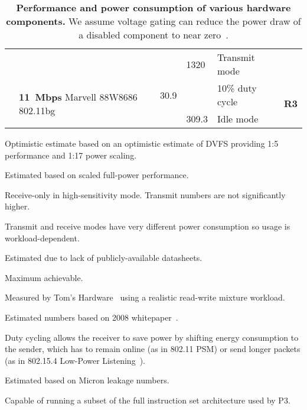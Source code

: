 \begin{table}[t]
\begin{threeparttable}
{\begin{tabularx}{\textwidth}{clrlXr}
& & &
1320\tnote{8} &
Transmit mode
& \\ \cmidrule(l){2-6}

&
\multirow{2}{*}{\textbf{11~Mbps} Marvell 88W8686 802.11bg} &
30.9\tnote{2} & &
10\% duty cycle\tnote{9} &
\multirow{2}{*}{\textbf{R3}}
\\

& & &
309.3\tnote{4} &
Idle mode\tnote{4}
& \\ \toprule

\end{tabularx}
}
{\footnotesize
\begin{tablenotes}
\item [1] Optimistic estimate based on an optimistic estimate of DVFS providing 1:5 performance and
1:17 power scaling\cite{jssc02-PowerPC-SoC}.
\item [2] Estimated based on scaled full-power performance.
\item [3] Receive-only in high-sensitivity mode. Transmit numbers are not
significantly higher.
\item [4] Transmit and receive modes have very different power
consumption so usage is workload-dependent.
\item [5] Estimated due to lack of publicly-available datasheets.
\item [6] Maximum achievable.
\item [7] Measured by Tom's Hardware~\cite{ssd-tomshardware} using a realistic read-write mixture workload.
\item [8] Estimated numbers based on 2008
whitepaper~\cite{option3gpower-whitepaper}.
\item [9] Duty cycling allows the receiver to save power by shifting energy
consumption to the sender, which has to remain online (as in 802.11
PSM) or send longer packets (as in 802.15.4 Low-Power
Listening~\cite{tinyos-lpl}).
\item [10] Estimated based on Micron leakage numbers.
\item [11] Capable of running a subset of the full instruction set architecture
used by P3.
\end{tablenotes}
}
\caption{\textbf{Performance and power consumption of various hardware
components.} We assume voltage gating can reduce the power draw of a disabled
component to near zero~\cite{islped-vdd-gate}.}
\end{threeparttable}
\label{table-components}
\end{table}
